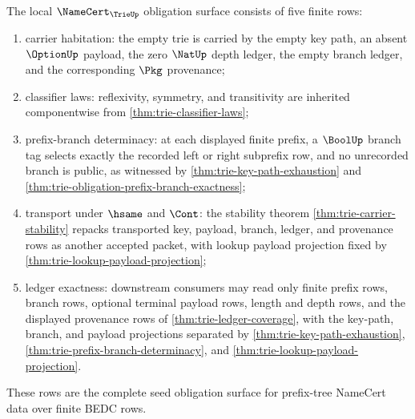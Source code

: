 \begin{theorem}\label{thm:trie-namecert-obligation-surface}
The local $\NameCert_{\TrieUp}$ obligation surface consists of five finite
rows:
\begin{enumerate}
\item carrier habitation: the empty trie is carried by the empty key path, an
absent $\OptionUp$ payload, the zero $\NatUp$ depth ledger, the empty branch
ledger, and the corresponding $\Pkg$ provenance;
\item classifier laws: reflexivity, symmetry, and transitivity are inherited
componentwise from \autoref{thm:trie-classifier-laws};
\item prefix-branch determinacy: at each displayed finite prefix, a $\BoolUp$
branch tag selects exactly the recorded left or right subprefix row, and no
unrecorded branch is public, as witnessed by
\autoref{thm:trie-key-path-exhaustion} and
\autoref{thm:trie-obligation-prefix-branch-exactness};
\item transport under $\hsame$ and $\Cont$: the stability theorem
\autoref{thm:trie-carrier-stability} repacks transported key, payload, branch,
ledger, and provenance rows as another accepted packet, with lookup payload
projection fixed by \autoref{thm:trie-lookup-payload-projection};
\item ledger exactness: downstream consumers may read only finite prefix
rows, branch rows, optional terminal payload rows, length and depth rows, and
the displayed provenance rows of \autoref{thm:trie-ledger-coverage}, with the
key-path, branch, and payload projections separated by
\autoref{thm:trie-key-path-exhaustion},
\autoref{thm:trie-prefix-branch-determinacy}, and
\autoref{thm:trie-lookup-payload-projection}.
\end{enumerate}
These rows are the complete seed obligation surface for prefix-tree
NameCert data over finite BEDC rows.
\end{theorem}
